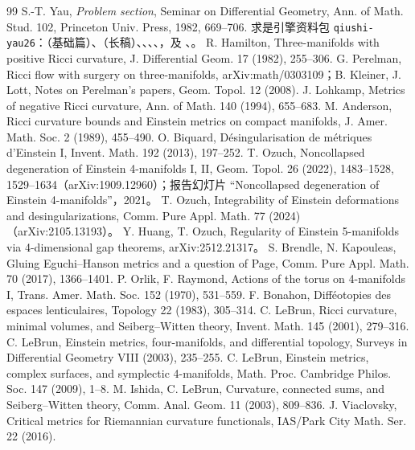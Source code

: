 \begin{thebibliography}{99}\small
{} S.-T. Yau, \emph{Problem section}, Seminar on Differential Geometry, Ann. of Math. Stud. 102, Princeton Univ. Press, 1982, 669--706.
 求是引擎资料包 \texttt{qiushi-yau26}：（基础篇）、（长稿）、、、、，及 、。
 R. Hamilton, Three-manifolds with positive Ricci curvature, J. Differential Geom. 17 (1982), 255--306.
 G. Perelman, Ricci flow with surgery on three-manifolds, arXiv:math/0303109；B. Kleiner, J. Lott, Notes on Perelman's papers, Geom. Topol. 12 (2008).
 J. Lohkamp, Metrics of negative Ricci curvature, Ann. of Math. 140 (1994), 655--683.
 M. Anderson, Ricci curvature bounds and Einstein metrics on compact manifolds, J. Amer. Math. Soc. 2 (1989), 455--490.
 O. Biquard, Désingularisation de métriques d'Einstein I, Invent. Math. 192 (2013), 197--252.
 T. Ozuch, Noncollapsed degeneration of Einstein 4-manifolds I, II, Geom. Topol. 26 (2022), 1483--1528, 1529--1634（arXiv:1909.12960）；报告幻灯片 “Noncollapsed degeneration of Einstein 4-manifolds”，2021。
 T. Ozuch, Integrability of Einstein deformations and desingularizations, Comm. Pure Appl. Math. 77 (2024)（arXiv:2105.13193）。
 Y. Huang, T. Ozuch, Regularity of Einstein 5-manifolds via 4-dimensional gap theorems, arXiv:2512.21317。
 S. Brendle, N. Kapouleas, Gluing Eguchi--Hanson metrics and a question of Page, Comm. Pure Appl. Math. 70 (2017), 1366--1401.
 P. Orlik, F. Raymond, Actions of the torus on 4-manifolds I, Trans. Amer. Math. Soc. 152 (1970), 531--559.
 F. Bonahon, Difféotopies des espaces lenticulaires, Topology 22 (1983), 305--314.
 C. LeBrun, Ricci curvature, minimal volumes, and Seiberg--Witten theory, Invent. Math. 145 (2001), 279--316.
 C. LeBrun, Einstein metrics, four-manifolds, and differential topology, Surveys in Differential Geometry VIII (2003), 235--255.
 C. LeBrun, Einstein metrics, complex surfaces, and symplectic 4-manifolds, Math. Proc. Cambridge Philos. Soc. 147 (2009), 1--8.
 M. Ishida, C. LeBrun, Curvature, connected sums, and Seiberg--Witten theory, Comm. Anal. Geom. 11 (2003), 809--836.
 J. Viaclovsky, Critical metrics for Riemannian curvature functionals, IAS/Park City Math. Ser. 22 (2016).

\end{thebibliography}
